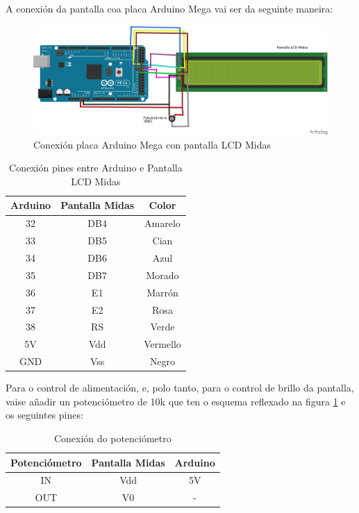 \documentclass[11pt,twoside]{book}
\begin{document}
A conexión da pantalla coa placa Arduino Mega vai ser da seguinte maneira:

\begin{figure}[H]
	\begin{center}
		\includegraphics[width=15cm]{images/conexionArduinoLCD.png}
	\end{center}
	\caption{Conexión placa Arduino Mega con pantalla LCD Midas}
	\label{fig:ConexionPantalla}
\end{figure}

\begin{table}[h]
\begin{center}
\begin{tabular}{|c|c|c|}
\hline
Arduino & Pantalla Midas & Color \\
\hline
32 & DB4 & Amarelo \\
\hline
33 & DB5 & Cian\\
\hline
34 & DB6 & Azul \\
\hline
35 & DB7 & Morado \\
\hline
36 & E1 & Marrón \\
\hline
37 & E2 & Rosa \\
\hline
38 & RS & Verde \\
\hline
5V & Vdd & Vermello \\
\hline
GND & Vss & Negro \\
\hline
\end{tabular}
\caption{Conexión pines entre Arduino e Pantalla LCD Midas}
\label{TablaArduinoPantalla}
\end{center}
\end{table}

Para o control de alimentación, e, polo tanto, para o control de brillo da pantalla, vaise añadir un potenciómetro de 10k que ten o esquema reflexado na figura \ref{fig:ConexionPantalla} e os seguintes pines:

\begin{table}[htbt]
\begin{center}
\begin{tabular}{|c|c|c|}
\hline
Potenciómetro & Pantalla Midas & Arduino\\
\hline
IN & Vdd & 5V \\
\hline
OUT & V0 & -\\
\hline
\end{tabular}
\caption{Conexión do potenciómetro}
\label{TablaPotenciometro}
\end{center}
\end{table}
\end{document}
